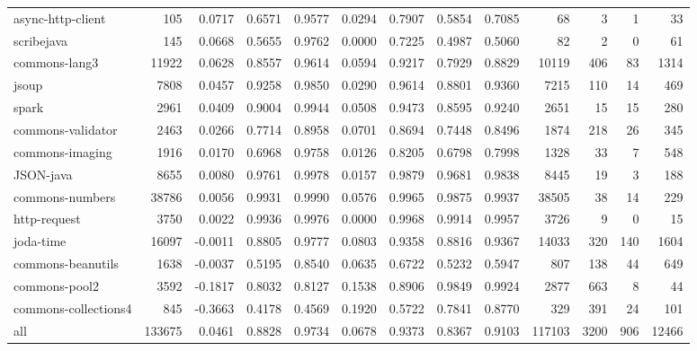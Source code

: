 \begin{table*}
\begin{tabular}{lrrrrrrrrrrrr}
      async-http-client &     105 &      0.0717 &  0.6571 &     0.9577 &     0.0294 &  0.7907 &     0.5854 &   0.7085 &      68 &     3 &    1 &     33 \\
             scribejava &     145 &      0.0668 &  0.5655 &     0.9762 &     0.0000 &  0.7225 &     0.4987 &   0.5060 &      82 &     2 &    0 &     61 \\
          commons-lang3 &   11922 &      0.0628 &  0.8557 &     0.9614 &     0.0594 &  0.9217 &     0.7929 &   0.8829 &   10119 &   406 &   83 &   1314 \\
                  jsoup &    7808 &      0.0457 &  0.9258 &     0.9850 &     0.0290 &  0.9614 &     0.8801 &   0.9360 &    7215 &   110 &   14 &    469 \\
                  spark &    2961 &      0.0409 &  0.9004 &     0.9944 &     0.0508 &  0.9473 &     0.8595 &   0.9240 &    2651 &    15 &   15 &    280 \\
      commons-validator &    2463 &      0.0266 &  0.7714 &     0.8958 &     0.0701 &  0.8694 &     0.7448 &   0.8496 &    1874 &   218 &   26 &    345 \\
        commons-imaging &    1916 &      0.0170 &  0.6968 &     0.9758 &     0.0126 &  0.8205 &     0.6798 &   0.7998 &    1328 &    33 &    7 &    548 \\
              JSON-java &    8655 &      0.0080 &  0.9761 &     0.9978 &     0.0157 &  0.9879 &     0.9681 &   0.9838 &    8445 &    19 &    3 &    188 \\
        commons-numbers &   38786 &      0.0056 &  0.9931 &     0.9990 &     0.0576 &  0.9965 &     0.9875 &   0.9937 &   38505 &    38 &   14 &    229 \\
           http-request &    3750 &      0.0022 &  0.9936 &     0.9976 &     0.0000 &  0.9968 &     0.9914 &   0.9957 &    3726 &     9 &    0 &     15 \\
              joda-time &   16097 &     -0.0011 &  0.8805 &     0.9777 &     0.0803 &  0.9358 &     0.8816 &   0.9367 &   14033 &   320 &  140 &   1604 \\
      commons-beanutils &    1638 &     -0.0037 &  0.5195 &     0.8540 &     0.0635 &  0.6722 &     0.5232 &   0.5947 &     807 &   138 &   44 &    649 \\
          commons-pool2 &    3592 &     -0.1817 &  0.8032 &     0.8127 &     0.1538 &  0.8906 &     0.9849 &   0.9924 &    2877 &   663 &    8 &     44 \\
   commons-collections4 &     845 &     -0.3663 &  0.4178 &     0.4569 &     0.1920 &  0.5722 &     0.7841 &   0.8770 &     329 &   391 &   24 &    101 \\
                    all &  133675 &      0.0461 &  0.8828 &     0.9734 &     0.0678 &  0.9373 &     0.8367 &   0.9103 &  117103 &  3200 &  906 &  12466 \\
\bottomrule
\end{tabular}
\end{table*}
